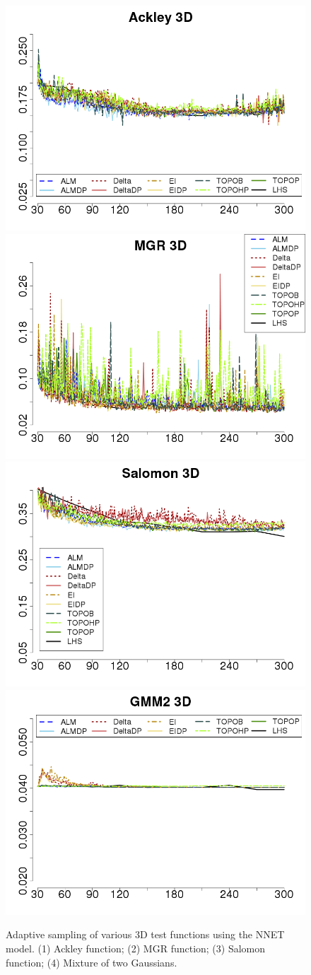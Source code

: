 \begin{figure}[htbp]
\begin{center}
\includegraphics[width=0.48\linewidth]{figs/chap5/nnet_Ackley_td=30}\label{fig:ackley3D_nnet}
\includegraphics[width=0.48\linewidth]{figs/chap5/nnet_MGR_td=30}\label{fig:mgr3D_nnet}
\includegraphics[width=0.48\linewidth]{figs/chap5/nnet_Salomon_td=30}\label{fig:salomon3D_nnet}
\includegraphics[width=0.48\linewidth]{figs/chap5/nnet_GMM2_3D_td=30}\label{fig:gmm23D_nnet}
\caption{Adaptive sampling of various 3D test functions using the
  NNET model. (1) Ackley function; (2) MGR function; (3) Salomon function;
  (4) Mixture of two Gaussians.}
  \label{fig:nnet_3D}
\end{center}
\end{figure}

